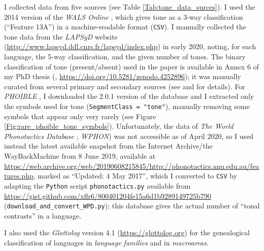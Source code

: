 \documentclass[twoside,twocolumn]{article}
\begin{document}
I collected data from five sources (see Table \ref{Tab:tone_data_surces}).
I used the 2014 version of the \textit{WALS Online} \citep{dryer_wals_2013}, which gives tone as a 3-way classification (``Feature 13A'') in a machine-readable format (\texttt{CSV}).
I manually collected the tone data from the \textit{LAPSyD} website (\url{http://www.lapsyd.ddl.cnrs.fr/lapsyd/index.php}) in early 2020, noting, for each language, the 5-way classification, and the given number of tones.
The binary classification of tone (present/absent) used in the \citet{dediu_ladd_2007} paper is available in Annex 6 of my PhD thesis (\citealp{dediu_phd_2007}, \url{https://doi.org/10.5281/zenodo.4252896}); it was manually curated from several primary and secondary sources (see \citealp{dediu_phd_2007} and \citealp{dediu_phd_2007} for details).
For \textit{PHOIBLE} \citep{moran_phoible_2014}, I downloaded the 2.0.1 version of the database and I extracted only the symbols used for tone (\texttt{SegmentClass = "tone"}), manually removing some symbols that appear only very rarely (see Figure \ref{Fig:rare_phoible_tone_symbols}).
Unfortunately, the data of \textit{The World Phonotactics Database} \citealp{donohue_world_2013}; \textit{WPHON}) was not accessible as of April 2020, so I used instead the latest available snapshot from the Internet Archive/the WayBackMachine from 8 June 2019, available at \url{https://web.archive.org/web/20190608215845/http://phonotactics.anu.edu.au/features.php}, marked as ``Updated: 4 May 2017'', which I converted to \texttt{CSV} by adapting the \texttt{Python} script \texttt{phonotactics.py} available from \url{https://gist.github.com/xflr6/800401204fe15a6d1b9289149725b790} (\verb|download_and_convert_WPD.py|); this database gives the actual number of ``tonal contrasts'' in a language.

I also used the \textit{Glottolog} \citep{hammarstrom_glottolog_2018} version 4.1 (\url{https://glottolog.org}) for the genealogical classification of languages in \emph{language families} and in \textit{macroareas}.
\end{document}
